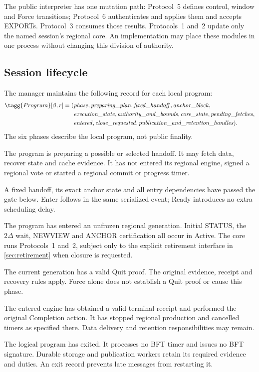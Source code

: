 The public interpreter has one mutation path: Protocol~5 defines
control, window and Force transitions; Protocol~6 authenticates and
applies them and accepts EXPORTs. Protocol~3 consumes those results.
Protocols~1 and~2 update only the named session's regional core.
An implementation may place these modules in one process without
changing this division of authority.

\subsection{Session lifecycle}
\label{sec:session-lifecycle}
The manager maintains the following record for each local program:
\[
\begin{aligned}
\tagg{Program}[\beta,r]=(&\mathit{phase},\mathit{preparing\_plan},
 \mathit{fixed\_handoff},\mathit{anchor\_block},\\
 &\mathit{execution\_state},\mathit{authority\_and\_bounds},
 \mathit{core\_state},\mathit{pending\_fetches},\\
 &\mathit{entered},\mathit{close\_requested},
 \mathit{publication\_and\_retention\_handles}).
\end{aligned}
\]
The six phases describe the local program, not public finality.
\begin{description}[style=nextline,leftmargin=0pt]
\item[Waiting.] The program is preparing a possible or selected
handoff. It may fetch data, recover state and cache evidence. It has
not entered its regional engine, signed a regional vote or started
a regional commit or progress timer.
\item[Ready.] A fixed handoff, its exact anchor state and all entry
dependencies have passed the gate below. Enter follows in the same
serialized event; Ready introduces no extra scheduling delay.
\item[Active.] The program has entered an unfrozen regional
generation. Initial STATUS, the $2\Delta$ wait, NEWVIEW and ANCHOR
certification all occur in Active. The core runs Protocols~1 and~2,
subject only to the explicit retirement interface in
\cref{sec:retirement} when closure is requested.
\item[Frozen.] The current generation has a valid Quit proof.
The original evidence, receipt and recovery rules apply. Force alone
does not establish a Quit proof or cause this phase.
\item[Completed.] The entered engine has obtained a valid terminal
receipt and performed the original Completion action. It has stopped
regional production and cancelled timers as specified there. Data
delivery and retention responsibilities may remain.
\item[Terminated.] The logical program has exited. It processes no
BFT timer and issues no BFT signature. Durable storage and publication
workers retain its required evidence and duties. An exit record prevents
late messages from restarting it.
\end{description}

